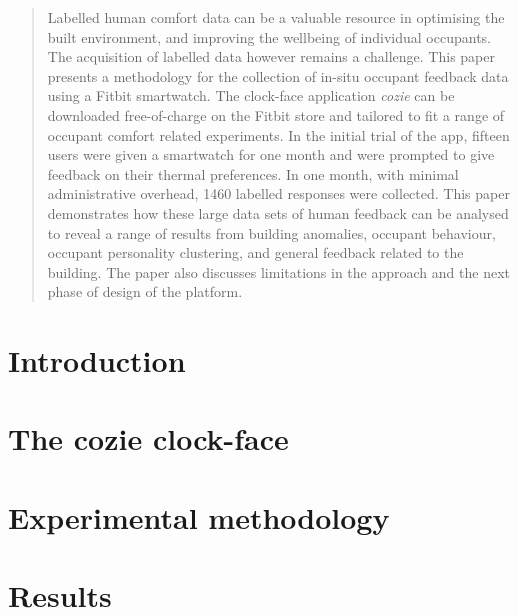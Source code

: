 \documentclass[a4paper]{jpconf} %
\begin{document}


\begin{abstract}
Labelled human comfort data can be a valuable resource in optimising the built environment, and improving the wellbeing of individual occupants. The acquisition of labelled data however remains a challenge. This paper presents a methodology for the collection of in-situ occupant feedback data using a Fitbit smartwatch. The clock-face application \emph{cozie} can be downloaded free-of-charge on the Fitbit store and tailored to fit a range of occupant comfort related experiments. In the initial trial of the app, fifteen users were given a smartwatch for one month and were prompted to give feedback on their thermal preferences. In one month, with minimal administrative overhead, 1460 labelled responses were collected. This paper demonstrates how these large data sets of human feedback can be analysed to reveal a range of results from building anomalies, occupant behaviour, occupant personality clustering, and general feedback related to the building. The paper also discusses limitations in the approach and the next phase of design of the platform.

\end{abstract}



\section{Introduction}
\label{ch:introduction}


\section{The cozie clock-face}
\label{ch:cozie}


\section{Experimental methodology}
\label{ch:method}


\section{Results}
\label{ch:results}

\end{document}
